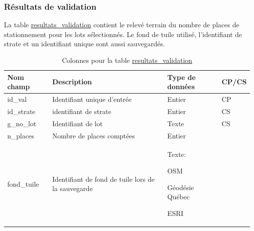         \subsubsection{Résultats de validation}
        La table \ul{resultats\_validation} contient le relevé terrain du nombre de places de stationnement pour les lots sélectionnés. Le fond de tuile utilisé, l'identifiant de strate et un identifiant unique sont aussi sauvegardés.
        \begin{table}[H]
            \caption{Colonnes pour la table \underline{resultats\_validation}}
            \label{tab:definition_resultats_valid}
            \centering
            \begin{tabular}{m{}|m{}m{}m{}}
                \hline
                Nom champ & Description & Type de données & CP/CS  \\
                \hline
                id\_val & Identifiant unique d'entrée & Entier & CP \\
                id\_strate & identifiant de strate & Entier & CS \\
                g\_no\_lot & Identifiant de lot & Texte & CS \\
                n\_places & Nombre de places comptées & Entier & \\
                fond\_tuile & Identifiant de fond de tuile lors de la sauvegarde  & Texte: \begin{compactitem}\item OSM \item Géodésie Québec \item ESRI \end{compactitem}  & \\
                \hline
           \end{tabular}
        \end{table}
        \FloatBarrier
